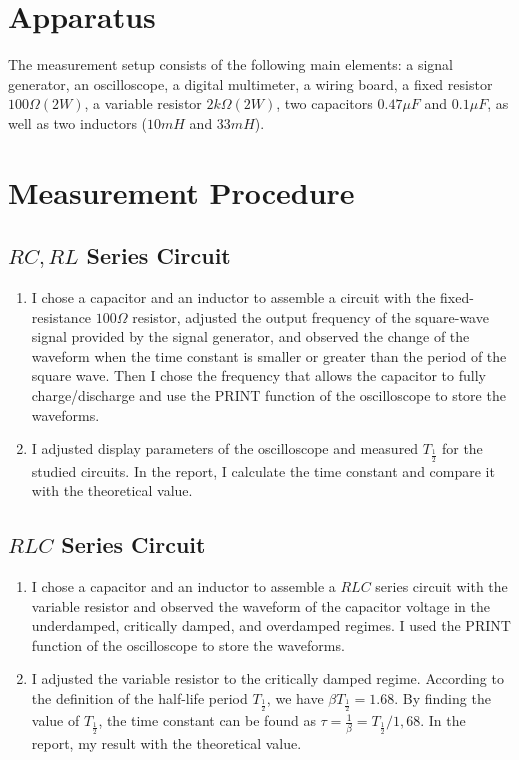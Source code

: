 \documentclass[12pt]{article}
\begin{document}
\section{Apparatus}
The measurement setup consists of the following main elements: a signal generator, an
oscilloscope, a digital multimeter, a wiring board, a fixed resistor $100\Omega(2W)$, a variable
resistor $2k\Omega(2W)$, two capacitors $0.47\mu F$ and $0.1\mu F$, as well as two inductors ($10mH$
and $33mH$).
\section{Measurement Procedure}
\subsection{$RC,RL$ Series Circuit}
\begin{enumerate}
\item I chose a capacitor and an inductor to assemble a circuit with the fixed-resistance $100\Omega$ resistor, adjusted the output frequency of the square-wave signal provided by the signal generator, and observed the change of the waveform when the time constant is smaller or greater than the period of the square wave. Then I chose the frequency that allows the capacitor to fully charge/discharge and use the PRINT function of the oscilloscope to store the waveforms.
\item I adjusted display parameters of the oscilloscope and measured $T_{\frac{1}{2}}$ for the studied circuits. In the report, I calculate the time constant and compare it with the theoretical value. 
\end{enumerate}
\subsection{$RLC$ Series Circuit}
\begin{enumerate}
\item I chose a capacitor and an inductor to assemble a $RLC$ series circuit with the variable resistor and observed the waveform of the capacitor voltage in the underdamped, critically damped, and overdamped regimes. I used the PRINT function of the oscilloscope to store the waveforms.
\item I adjusted the variable resistor to the critically damped regime. According to the
definition of the half-life period $T_{\frac{1}{2}}$, we have $\beta T_{\frac{1}{2}}=1.68$. By finding the value of
$T_{\frac{1}{2}}$, the time constant can be found as $\tau=\frac{1}{\beta}=T_{\frac{1}{2}}/1,68$. In the report, my result
with the theoretical value.
\end{enumerate}
\end{document}
